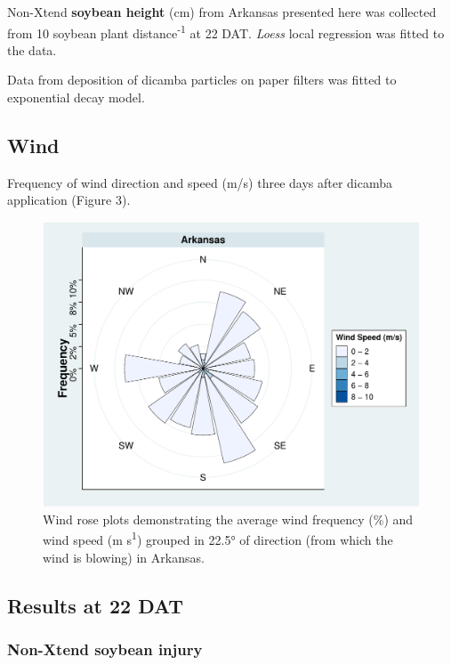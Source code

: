 \documentclass[]{article}
\begin{document}
Non-Xtend \textbf{soybean height} (cm) from Arkansas presented here was
collected from 10 soybean plant distance\textsuperscript{-1} at 22 DAT.
\emph{Loess} local regression was fitted to the data.

Data from deposition of dicamba particles on paper filters was fitted to
exponential decay model.

\newpage

\subsection{Wind}\label{wind}

Frequency of wind direction and speed (m/s) three days after dicamba
application (Figure 3).

\begin{figure}
\centering
\includegraphics{Report_files/figure-latex/unnamed-chunk-9-1.pdf}
\caption{Wind rose plots demonstrating the average wind frequency (\%)
and wind speed (m s\textsuperscript{1}) grouped in 22.5° of direction
(from which the wind is blowing) in Arkansas.}
\end{figure}

\newpage

\subsection{Results at 22 DAT}\label{results-at-22-dat}

\subsubsection{Non-Xtend soybean injury}\label{non-xtend-soybean-injury}
\end{document}
